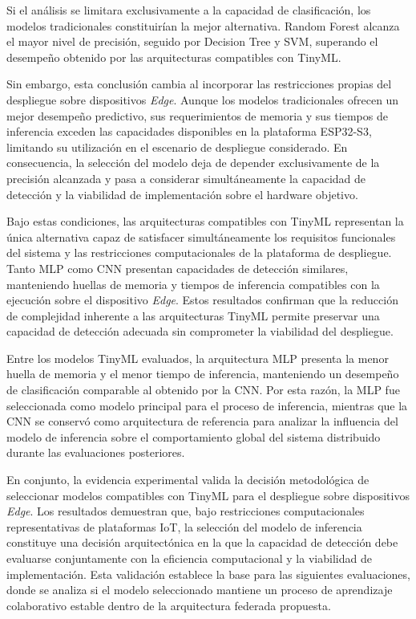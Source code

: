 \documentclass[journal,article,submit,moreauthors]{Definitions/mdpi}
\begin{document}
Si el análisis se limitara exclusivamente a la capacidad de clasificación, los modelos tradicionales constituirían la mejor alternativa. Random Forest alcanza el mayor nivel de precisión, seguido por Decision Tree y SVM, superando el desempeño obtenido por las arquitecturas compatibles con TinyML.

Sin embargo, esta conclusión cambia al incorporar las restricciones propias del despliegue sobre dispositivos \textit{Edge}. Aunque los modelos tradicionales ofrecen un mejor desempeño predictivo, sus requerimientos de memoria y sus tiempos de inferencia exceden las capacidades disponibles en la plataforma ESP32-S3, limitando su utilización en el escenario de despliegue considerado. En consecuencia, la selección del modelo deja de depender exclusivamente de la precisión alcanzada y pasa a considerar simultáneamente la capacidad de detección y la viabilidad de implementación sobre el hardware objetivo.

Bajo estas condiciones, las arquitecturas compatibles con TinyML representan la única alternativa capaz de satisfacer simultáneamente los requisitos funcionales del sistema y las restricciones computacionales de la plataforma de despliegue. Tanto MLP como CNN presentan capacidades de detección similares, manteniendo huellas de memoria y tiempos de inferencia compatibles con la ejecución sobre el dispositivo \textit{Edge}. Estos resultados confirman que la reducción de complejidad inherente a las arquitecturas TinyML permite preservar una capacidad de detección adecuada sin comprometer la viabilidad del despliegue.

Entre los modelos TinyML evaluados, la arquitectura MLP presenta la menor huella de memoria y el menor tiempo de inferencia, manteniendo un desempeño de clasificación comparable al obtenido por la CNN. Por esta razón, la MLP fue seleccionada como modelo principal para el proceso de inferencia, mientras que la CNN se conservó como arquitectura de referencia para analizar la influencia del modelo de inferencia sobre el comportamiento global del sistema distribuido durante las evaluaciones posteriores.

En conjunto, la evidencia experimental valida la decisión metodológica de seleccionar modelos compatibles con TinyML para el despliegue sobre dispositivos \textit{Edge}. Los resultados demuestran que, bajo restricciones computacionales representativas de plataformas IoT, la selección del modelo de inferencia constituye una decisión arquitectónica en la que la capacidad de detección debe evaluarse conjuntamente con la eficiencia computacional y la viabilidad de implementación. Esta validación establece la base para las siguientes evaluaciones, donde se analiza si el modelo seleccionado mantiene un proceso de aprendizaje colaborativo estable dentro de la arquitectura federada propuesta.
\end{document}
